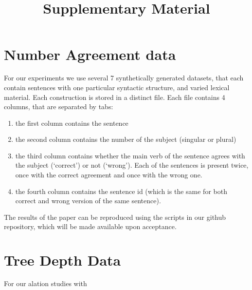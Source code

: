 \documentclass{article}
\title{Supplementary Material}
\date{}
\author{}
\begin{document}
\maketitle

\section*{Number Agreement data}

For our experiments we use several 7 synthetically generated datasets, that each contain sentences with one particular syntactic structure, and varied lexical material.
Each construction is stored in a distinct file.
Each file contains 4 columns, that are separated by tabs:\begin{enumerate}
    \item the first column contains the sentence
    \item the second column  contains the number of the subject (singular or plural)
    \item the third column contains whether the main verb of the sentence agrees with the subject (`correct') or not (`wrong'). Each of the sentences is present twice, once with the correct agreement and once with the wrong one.
    \item the fourth column contains the sentence id (which is the same for both correct and wrong version of the same sentence).
\end{enumerate}

The results of the paper can be reproduced using the scripts in our github repository, which will be made available upon acceptance.


\section*{Tree Depth Data}

For our alation studies with 
\end{document}
